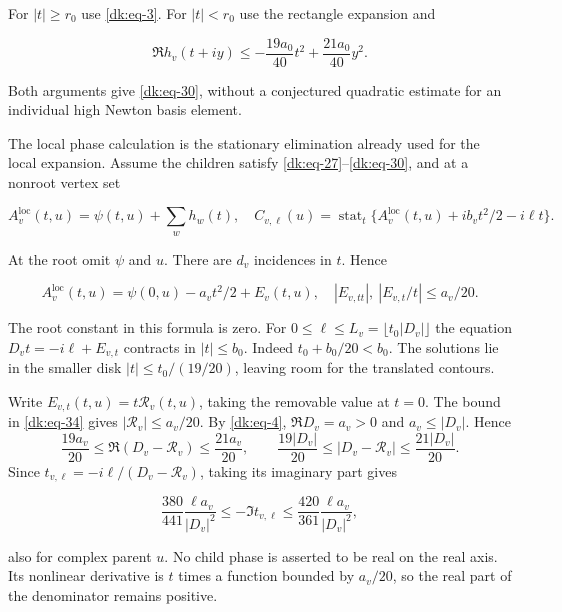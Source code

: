 For \(|t|\ge r_0\) use \eqref{dk:eq-3}. For \(|t|<r_0\) use the rectangle expansion and

\begin{equation}\label{dk:eq-32}
\Re h_v(t+iy)\le
       -\frac{19a_0}{40}t^2+\frac{21a_0}{40}y^2.
\end{equation}

Both arguments give \eqref{dk:eq-30}, without a conjectured quadratic estimate for
an individual high Newton basis element.

The local phase calculation is the stationary elimination already used
for the local expansion. Assume the children satisfy
\eqref{dk:eq-27}--\eqref{dk:eq-30}, and at a nonroot vertex set

\begin{equation}\label{dk:eq-33}
A_v^{\mathrm{loc}}(t,u)=\psi(t,u)+\sum_wh_w(t),
 \quad
 C_{v,\ell}(u)=\operatorname{stat}_t
       \{A_v^{\mathrm{loc}}(t,u)+ib_vt^2/2-i\ell t\}.
\end{equation}

At the root omit \(\psi\) and \(u\). There are \(d_v\) incidences in \(t\). Hence

\begin{equation}\label{dk:eq-34}
A_v^{\mathrm{loc}}(t,u)=\psi(0,u)-a_vt^2/2+E_v(t,u),
       \quad |E_{v,tt}|,\ |E_{v,t}/t|\le a_v/20.
\end{equation}

The root constant in this formula is zero. For \(0\le\ell\le L_v=\lfloor t_0|D_v|\rfloor\)
the equation \(D_vt=-i\ell+E_{v,t}\) contracts in \(|t|\le b_0\). Indeed
\(t_0+b_0/20<b_0\). The solutions lie in the smaller disk
\(|t|\le t_0/(19/20)\), leaving room for the translated contours.

Write $E_{v,t}(t,u)=t\mathcal R_v(t,u)$, taking the removable value
at $t=0$. The bound in \eqref{dk:eq-34} gives
$|\mathcal R_v|\le a_v/20$. By \eqref{dk:eq-4},
$\Re D_v=a_v>0$ and $a_v\le|D_v|$. Hence
\[
 \frac{19a_v}{20}\le\Re(D_v-\mathcal R_v)\le\frac{21a_v}{20},
 \qquad
 \frac{19|D_v|}{20}\le|D_v-\mathcal R_v|\le\frac{21|D_v|}{20}.
\]
Since $t_{v,\ell}=-i\ell/(D_v-\mathcal R_v)$, taking its imaginary part gives

\begin{equation}\label{dk:eq-35}
\frac{380}{441}\frac{\ell a_v}{|D_v|^2}
 \le-\Im t_{v,\ell}\le
 \frac{420}{361}\frac{\ell a_v}{|D_v|^2},
\end{equation}

also for complex parent \(u\). No child phase is asserted to be real on
the real axis. Its nonlinear derivative is \(t\) times a function bounded
by \(a_v/20\), so the real part of the denominator remains positive.


